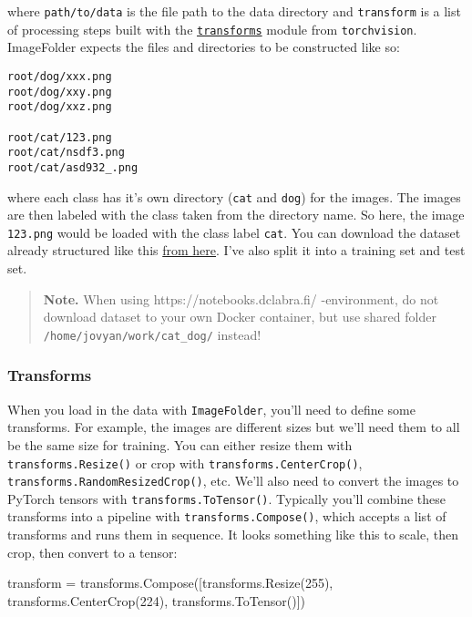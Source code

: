 \documentclass[11pt]{article}
\newenvironment{Shaded}{}{}
\newcommand{\DecValTok}[1]{\textcolor[rgb]{0.25,0.63,0.44}{{#1}}}
\newcommand{\NormalTok}[1]{{#1}}
\newcommand{\OperatorTok}[1]{\textcolor[rgb]{0.40,0.40,0.40}{{#1}}}
\begin{document}
where \texttt{\textquotesingle{}path/to/data\textquotesingle{}} is the
file path to the data directory and \texttt{transform} is a list of
processing steps built with the
\href{http://pytorch.org/docs/master/torchvision/transforms.html}{\texttt{transforms}}
module from \texttt{torchvision}. ImageFolder expects the files and
directories to be constructed like so:

\begin{verbatim}
root/dog/xxx.png
root/dog/xxy.png
root/dog/xxz.png

root/cat/123.png
root/cat/nsdf3.png
root/cat/asd932_.png
\end{verbatim}

where each class has it's own directory (\texttt{cat} and \texttt{dog})
for the images. The images are then labeled with the class taken from
the directory name. So here, the image \texttt{123.png} would be loaded
with the class label \texttt{cat}. You can download the dataset already
structured like this
\href{https://s3.amazonaws.com/content.udacity-data.com/nd089/Cat_Dog_data.zip}{from
here}. I've also split it into a training set and test set.

\begin{quote}
\textbf{Note.} When using https://notebooks.dclabra.fi/ -environment, do
not download dataset to your own Docker container, but use shared folder
\texttt{/home/jovyan/work/cat\_dog/} instead!
\end{quote}

\hypertarget{transforms}{%
\subsubsection{Transforms}\label{transforms}}

When you load in the data with \texttt{ImageFolder}, you'll need to
define some transforms. For example, the images are different sizes but
we'll need them to all be the same size for training. You can either
resize them with \texttt{transforms.Resize()} or crop with
\texttt{transforms.CenterCrop()},
\texttt{transforms.RandomResizedCrop()}, etc. We'll also need to convert
the images to PyTorch tensors with \texttt{transforms.ToTensor()}.
Typically you'll combine these transforms into a pipeline with
\texttt{transforms.Compose()}, which accepts a list of transforms and
runs them in sequence. It looks something like this to scale, then crop,
then convert to a tensor:

\begin{Shaded}
\begin{Highlighting}[]
\NormalTok{transform }\OperatorTok{=}\NormalTok{ transforms.Compose([transforms.Resize(}\DecValTok{255}\NormalTok{),}
\NormalTok{                                 transforms.CenterCrop(}\DecValTok{224}\NormalTok{),}
\NormalTok{                                 transforms.ToTensor()])}
\end{Highlighting}
\end{Shaded}
\end{document}
